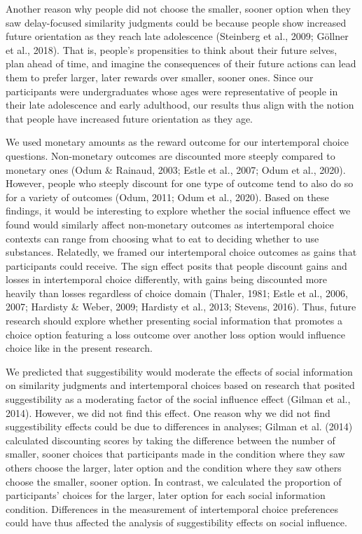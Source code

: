 \documentclass[
  pub,floatsintext]{apa6}
\begin{document}
Another reason why people did not choose the smaller, sooner option when they saw delay-focused similarity judgments could be because people show increased future orientation as they reach late adolescence (Steinberg et al., 2009; Göllner et al., 2018). That is, people's propensities to think about their future selves, plan ahead of time, and imagine the consequences of their future actions can lead them to prefer larger, later rewards over smaller, sooner ones. Since our participants were undergraduates whose ages were representative of people in their late adolescence and early adulthood, our results thus align with the notion that people have increased future orientation as they age.

We used monetary amounts as the reward outcome for our intertemporal choice questions. Non-monetary outcomes are discounted more steeply compared to monetary ones (Odum \& Rainaud, 2003; Estle et al., 2007; Odum et al., 2020). However, people who steeply discount for one type of outcome tend to also do so for a variety of outcomes (Odum, 2011; Odum et al., 2020). Based on these findings, it would be interesting to explore whether the social influence effect we found would similarly affect non-monetary outcomes as intertemporal choice contexts can range from choosing what to eat to deciding whether to use substances. Relatedly, we framed our intertemporal choice outcomes as gains that participants could receive. The sign effect posits that people discount gains and losses in intertemporal choice differently, with gains being discounted more heavily than losses regardless of choice domain (Thaler, 1981; Estle et al., 2006, 2007; Hardisty \& Weber, 2009; Hardisty et al., 2013; Stevens, 2016). Thus, future research should explore whether presenting social information that promotes a choice option featuring a loss outcome over another loss option would influence choice like in the present research.

We predicted that suggestibility would moderate the effects of social information on similarity judgments and intertemporal choices based on research that posited suggestibility as a moderating factor of the social influence effect (Gilman et al., 2014). However, we did not find this effect. One reason why we did not find suggestibility effects could be due to differences in analyses; Gilman et al. (2014) calculated discounting scores by taking the difference between the number of smaller, sooner choices that participants made in the condition where they saw others choose the larger, later option and the condition where they saw others choose the smaller, sooner option. In contrast, we calculated the proportion of participants' choices for the larger, later option for each social information condition. Differences in the measurement of intertemporal choice preferences could have thus affected the analysis of suggestibility effects on social influence.
\end{document}
